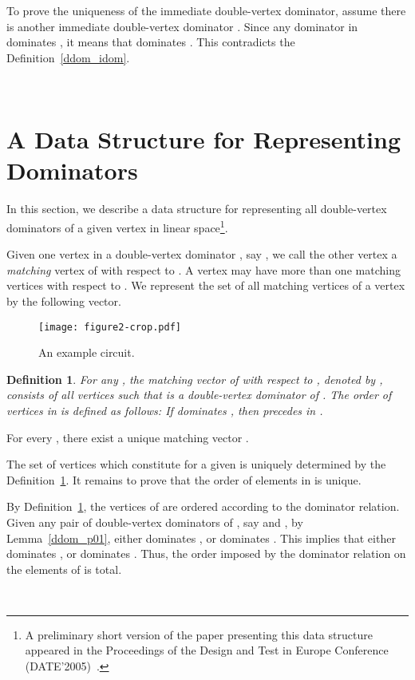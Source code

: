 \documentclass{llncs}
\newtheorem{defn}{Definition}
\begin{document}
To prove the uniqueness of the immediate double-vertex dominator, assume there is another immediate
double-vertex dominator . Since any dominator
in  dominates , it means that  dominates
. This contradicts the Definition~\ref{ddom_idom}.
\begin{flushright}
 \\
\end{flushright}



\section{A Data Structure for Representing Dominators}
\label{ddom_ds}

In this section, we describe a data structure for representing all double-vertex dominators of a given 
vertex in linear space\footnote{A preliminary short version of the paper presenting this data structure appeared in the Proceedings of the Design and Test in Europe Conference (DATE’2005)~\cite{TeD05b}.}.

Given one vertex in a double-vertex dominator ,  say , we call
the other vertex  a {\em matching} vertex of  with respect to .
A vertex may have more than one matching vertices with respect to . 
We represent the set of all matching vertices of a vertex by the
following vector.

\begin{figure}[t!]
\begin{center}
\texttt{[image: figure2-crop.pdf]}
\caption{An example circuit.} \label{ddom_f3}
\end{center}
\end{figure}


\begin{defn} \label{ddom_mv}
For any , the {\em matching vector} of  with respect to , denoted by , consists of
all vertices  such that  is a double-vertex dominator of .
The order of vertices in  is defined as follows: 
If  dominates , then  precedes  in .
\end{defn}

\begin{lemma} \label{ddom_tmv1}
For every , there exist  a unique matching vector .
\end{lemma}
 The set of vertices which constitute  for a given  is uniquely
determined by the Definition~\ref{ddom_mv}. It remains to prove that the
order of elements in  is unique. 

By Definition~\ref{ddom_mv}, the vertices of  are 
ordered according to the dominator relation. 
Given any pair of double-vertex dominators of , say  and  , 
by Lemma~\ref{ddom_p01}, either  dominates ,
or  dominates . This implies that either 
dominates , or  dominates . Thus, 
the order imposed by the dominator relation on the elements 
of  is total.
\begin{flushright}
 \\
\end{flushright}
\end{document}
